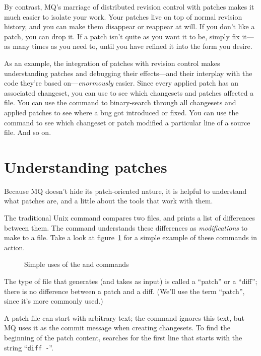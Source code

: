 By contrast, MQ's marriage of distributed revision control with
patches makes it much easier to isolate your work.  Your patches live
on top of normal revision history, and you can make them disappear or
reappear at will.  If you don't like a patch, you can drop it.  If a
patch isn't quite as you want it to be, simply fix it---as many times
as you need to, until you have refined it into the form you desire.

As an example, the integration of patches with revision control makes
understanding patches and debugging their effects---and their
interplay with the code they're based on---\emph{enormously} easier.
Since every applied patch has an associated changeset, you can use
 to see which changesets and patches
affected a file.  You can use the  command to
binary-search through all changesets and applied patches to see where
a bug got introduced or fixed.  You can use the 
command to see which changeset or patch modified a particular line of
a source file.  And so on.

\section{Understanding patches}
\label{chap:userfaq}

Because MQ doesn't hide its patch-oriented nature, it is helpful to
understand what patches are, and a little about the tools that work
with them.

The traditional Unix  command compares two files, and
prints a list of differences between them. The  command
understands these differences as \emph{modifications} to make to a
file.  Take a look at figure~\ref{ex:mq:diff} for a simple example of
these commands in action.

\begin{figure}[ht]
  \caption{Simple uses of the  and  commands}
  \label{ex:mq:diff}
\end{figure}

The type of file that  generates (and 
takes as input) is called a ``patch'' or a ``diff''; there is no
difference between a patch and a diff.  (We'll use the term ``patch'',
since it's more commonly used.)

A patch file can start with arbitrary text; the 
command ignores this text, but MQ uses it as the commit message when
creating changesets.  To find the beginning of the patch content,
 searches for the first line that starts with the
string ``\texttt{diff~-}''.

